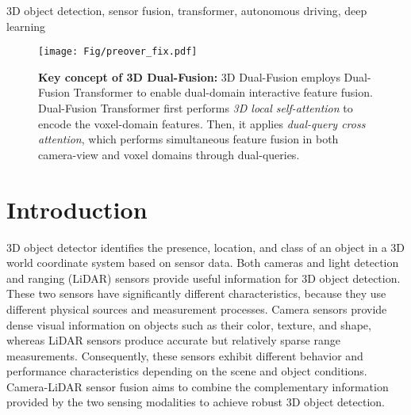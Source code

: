 \documentclass[lettersize,journal]{IEEEtran}
\begin{document}
\begin{IEEEkeywords}
3D object detection, sensor fusion, transformer, autonomous driving, deep learning
\end{IEEEkeywords}

\begin{figure}[t]
	\centering
    \texttt{[image: Fig/preover\_fix.pdf]}
	\caption {\textbf{Key concept of 3D Dual-Fusion:} 3D Dual-Fusion employs Dual-Fusion Transformer to enable dual-domain interactive feature fusion. Dual-Fusion Transformer first performs {\it 3D local self-attention} to encode the voxel-domain features. Then, it applies {\it dual-query cross attention}, which performs simultaneous feature fusion in both camera-view and voxel domains through dual-queries.     }
	\label{preoverall}
    \vspace{-0.5cm}
\end{figure}

\section{Introduction}
 3D object detector identifies the presence, location, and class of an object in a 3D world coordinate system based on sensor data. Both cameras and light detection and ranging (LiDAR) sensors provide useful information for 3D object detection. These two sensors have significantly different characteristics, because they use different physical sources and measurement processes. Camera sensors provide dense visual information on objects such as their color, texture, and shape, whereas LiDAR sensors produce accurate but relatively sparse range measurements. Consequently, these sensors exhibit different behavior and performance characteristics depending on the scene and object conditions. Camera-LiDAR sensor fusion aims to combine the complementary information provided by the two sensing modalities to achieve robust 3D object detection.
\end{document}
